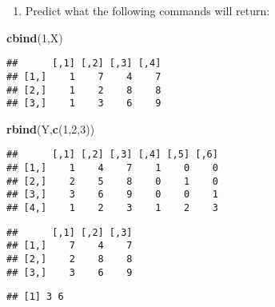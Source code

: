 \documentclass[]{article}
\newenvironment{Shaded}{\begin{snugshade}}{\end{snugshade}}
\newcommand{\KeywordTok}[1]{\textcolor[rgb]{0.13,0.29,0.53}{\textbf{#1}}}
\newcommand{\DecValTok}[1]{\textcolor[rgb]{0.00,0.00,0.81}{#1}}
\newcommand{\OperatorTok}[1]{\textcolor[rgb]{0.81,0.36,0.00}{\textbf{#1}}}
\newcommand{\NormalTok}[1]{#1}
\providecommand{\tightlist}{%
  \setlength{\itemsep}{0pt}\setlength{\parskip}{0pt}}
\begin{document}
\begin{enumerate}
\def\labelenumi{\arabic{enumi}.}
\setcounter{enumi}{7}
\tightlist
\item
  Predict what the following commands will return:
\end{enumerate}

\begin{Shaded}
\begin{Highlighting}[]
\KeywordTok{cbind}\NormalTok{(}\DecValTok{1}\NormalTok{,X)}
\end{Highlighting}
\end{Shaded}

\begin{verbatim}
##      [,1] [,2] [,3] [,4]
## [1,]    1    7    4    7
## [2,]    1    2    8    8
## [3,]    1    3    6    9
\end{verbatim}

\begin{Shaded}
\begin{Highlighting}[]
\KeywordTok{rbind}\NormalTok{(Y,}\KeywordTok{c}\NormalTok{(}\DecValTok{1}\NormalTok{,}\DecValTok{2}\NormalTok{,}\DecValTok{3}\NormalTok{))}
\end{Highlighting}
\end{Shaded}

\begin{verbatim}
##      [,1] [,2] [,3] [,4] [,5] [,6]
## [1,]    1    4    7    1    0    0
## [2,]    2    5    8    0    1    0
## [3,]    3    6    9    0    0    1
## [4,]    1    2    3    1    2    3
\end{verbatim}

\begin{Shaded}
\end{Shaded}

\begin{verbatim}
##      [,1] [,2] [,3]
## [1,]    7    4    7
## [2,]    2    8    8
## [3,]    3    6    9
\end{verbatim}

\begin{Shaded}
\end{Shaded}

\begin{verbatim}
## [1] 3 6
\end{verbatim}
\end{document}

